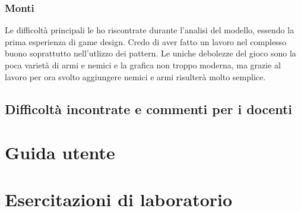 \documentclass[a4paper,12pt]{report}
\begin{document}
    \subsection{Monti}
    Le difficoltà principali le ho riscontrate durante l'analisi del modello, essendo la prima esperienza di game design.
    Credo di aver fatto un lavoro nel complesso buono soprattutto nell'utlizzo dei pattern.
    Le uniche debolezze del gioco sono la poca varietà di armi e nemici e la grafica non troppo moderna, ma grazie al lavoro per ora svolto
    aggiungere nemici e armi risulterà molto semplice.
    \section{Difficoltà incontrate e commenti per i docenti}
    \appendix
    \chapter{Guida utente}
    \chapter{Esercitazioni di laboratorio}
    \printbibliography[heading=bibintoc]
\end{document}
